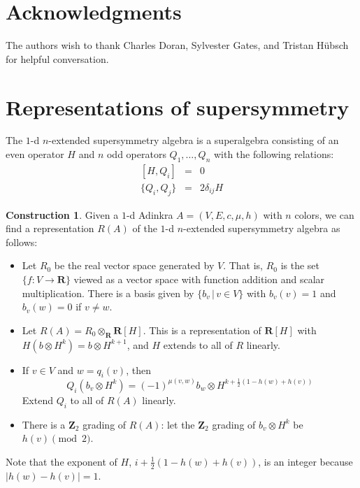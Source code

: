 \documentclass[12pt,twoside,singlespace]{article}
\numberwithin{equation}{section}
\theoremstyle{definition}
\newtheorem{construction}[equation]{Construction}
\newcommand{\ZZ}{\mathbf{Z}}
\newcommand{\RR}{\mathbf{R}}
\begin{document}
\section*{Acknowledgments}

The authors wish to thank Charles Doran, Sylvester Gates, and Tristan H\"ubsch for helpful conversation.

\appendix

\section{Representations of supersymmetry}
The $1$-d $n$-extended supersymmetry algebra is a superalgebra consisting of an even operator $H$ and $n$ odd operators $Q_1, \ldots, Q_n$ with the following relations:
\begin{eqnarray}
\label{eqn:susy1d1}
[H,Q_i]&=&0\\
\label{eqn:susy1d2}
\{Q_i,Q_j\}&=&2\delta_{ij}H
\end{eqnarray}

\begin{construction}
\label{cons:susy1d}
Given a $1$-d Adinkra $A=(V,E,c,\mu,h)$ with $n$ colors, we can find a representation $R(A)$ of the $1$-d $n$-extended supersymmetry algebra as follows:
\begin{itemize}
\item Let $R_0$ be the real vector space generated by $V$.  That is, $R_0$ is the set $\{f:V\to \RR\}$ viewed as a vector space with function addition and scalar multiplication.  There is a basis given by $\{b_v\,|\,v\in V\}$ with $b_v(v)=1$ and $b_v(w)=0$ if $v\not=w$.
\item Let $R(A)=R_0\otimes_\RR \RR[H]$.  This is a representation of $\RR[H]$ with $H(b\otimes H^k)=b\otimes H^{k+1}$, and $H$ extends to all of $R$ linearly.
\item If $v\in V$ and $w=q_i(v)$, then
\[Q_i(b_v\otimes H^k)=(-1)^{\mu(v,w)} b_w\otimes H^{k+\frac12(1-h(w)+h(v))}\]
Extend $Q_i$ to all of $R(A)$ linearly.
\item There is a $\ZZ_2$ grading of $R(A)$: let the $\ZZ_2$ grading of $b_v\otimes H^k$ be $h(v)\pmod{2}$.
\end{itemize}
\end{construction}
Note that the exponent of $H$, $i+\frac12(1-h(w)+h(v))$, is an integer because $|h(w)-h(v)|=1$.
\end{document}
